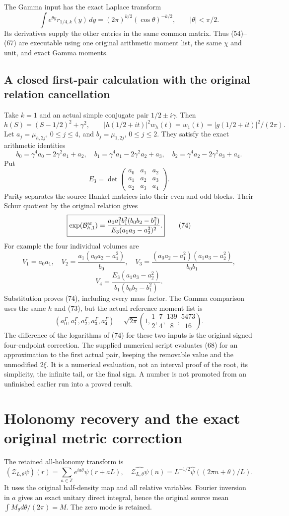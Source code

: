 \documentclass[11pt]{article}
\begin{document}
The Gamma input has the exact Laplace transform
\[
 \int e^{\theta y}r_{1/4,k}(y)\,dy
    =(2\pi)^{k/2}(\cos\theta)^{-k/2},\qquad |\theta|<\pi/2.
 \tag{71}
\]
Its derivatives supply the other entries in the same common matrix. Thus (54)--(67) are executable using one original arithmetic moment list, the same $\chi$ and unit, and exact Gamma moments.

\subsection{A closed first-pair calculation with the original relation cancellation}
Take $k=1$ and an actual simple conjugate pair $1/2\pm i\gamma$. Then
\[
 h(S)=(S-1/2)^2+\gamma^2,\qquad
 |h(1/2+it)|^2w_h(t)=w_1(t)=|g(1/2+it)|^2/(2\pi).
 \tag{72}
\]
Let $a_j=\mu_{h,2j}$, $0\le j\le4$, and $b_j=\mu_{1,2j}$, $0\le j\le2$. They satisfy the exact arithmetic identities
\[
 b_0=\gamma^4a_0-2\gamma^2a_1+a_2,
 \quad b_1=\gamma^4a_1-2\gamma^2a_2+a_3,
 \quad b_2=\gamma^4a_2-2\gamma^2a_3+a_4.
 \tag{73}
\]
Put
\[
 E_3=\det\begin{pmatrix}a_0&a_1&a_2\\a_1&a_2&a_3\\a_2&a_3&a_4\end{pmatrix}.
\]
Parity separates the source Hankel matrices into their even and odd blocks. Their Schur quotient by the original relation gives
\[
 \boxed{\exp(\mathcal B^{\rm ar}_{h,1})
 =\frac{a_0a_1^2b_1^2(b_0b_2-b_1^2)}
              {E_3(a_1a_3-a_2^2)^2}.}
 \tag{74}
\]
For example the four individual volumes are
\[
 V_1=a_0a_1,\quad
 V_2=\frac{a_1(a_0a_2-a_1^2)}{b_0},\quad
 V_3=\frac{(a_0a_2-a_1^2)(a_1a_3-a_2^2)}{b_0b_1},
\]
\[
 V_4=\frac{E_3(a_1a_3-a_2^2)}{b_1(b_0b_2-b_1^2)}.
 \tag{75}
\]
Substitution proves (74), including every mass factor. The Gamma comparison uses the same $h$ and (73), but the actual reference moment list is
\[
 (a_0^\Gamma,a_1^\Gamma,a_2^\Gamma,a_3^\Gamma,a_4^\Gamma)
 =\sqrt{2\pi}\left(1,\frac12,\frac74,\frac{139}{8},\frac{5473}{16}\right).
 \tag{76}
\]
The difference of the logarithms of (74) for these two inputs is the original signed four-endpoint correction. The supplied numerical script evaluates (68) for an approximation to the first actual pair, keeping the removable value and the unmodified $2\xi$. It is a numerical evaluation, not an interval proof of the root, its simplicity, the infinite tail, or the final sign. A number is not promoted from an unfinished earlier run into a proved result.

\section{Holonomy recovery and the exact original metric correction}
The retained all-holonomy transform is
\[
 (\mathcal Z_{L,\theta}\psi)(r)
   =\sum_{a\in\mathbb Z}e^{ia\theta}\psi(r+aL),
 \quad\widehat{\mathcal Z_{L,\theta}\psi}(n)
   =L^{-1/2}\widehat\psi((2\pi n+\theta)/L).
 \tag{77}
\]
It uses the original half-density map and all relative variables. Fourier inversion in $a$ gives an exact unitary direct integral, hence the original source mean $\int M_\theta d\theta/(2\pi)=M$. The zero mode is retained.
\end{document}
